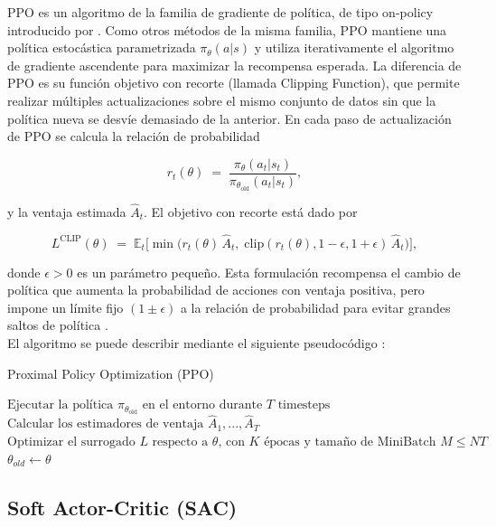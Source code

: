 PPO es un algoritmo de la familia de gradiente de política, de tipo on-policy introducido por \textcite{schulman2017ppo}. Como otros métodos de la misma familia, PPO mantiene una política estocástica parametrizada $\pi_\theta(a|s)$ y utiliza iterativamente el algoritmo de gradiente ascendente para maximizar la recompensa esperada. La diferencia de PPO es su función objetivo con recorte (llamada Clipping Function), que permite realizar múltiples actualizaciones sobre el mismo conjunto de datos sin que la política nueva se desvíe demasiado de la anterior. En cada paso de actualización de PPO se calcula la relación de probabilidad

$$
r_t(\theta) \;=\; \frac{\pi_\theta(a_t|s_t)}{\pi_{\theta_{\text{old}}}(a_t|s_t)},
$$

y la ventaja estimada $\hat A_t$. El objetivo con recorte está dado por

$$
L^{\mathrm{CLIP}}(\theta) \;=\; \mathbb{E}_t\Big[\min\big(r_t(\theta)\,\hat A_t,\;\mathrm{clip}(r_t(\theta),1-\epsilon,1+\epsilon)\,\hat A_t\big)\Big],
$$

donde $\epsilon>0$ es un parámetro pequeño. Esta formulación recompensa el cambio de política que aumenta la probabilidad de acciones con ventaja positiva, pero impone un límite fijo $(1\pm \epsilon)$ a la relación de probabilidad para evitar grandes saltos de política \parencite{schulman2017ppo}.\\

El algoritmo se puede describir mediante el siguiente pseudocódigo \parencite{schulman2017ppo}:

\begin{algorithm}
	\caption{Proximal Policy Optimization (PPO)}\label{alg:ppo}
	\begin{algorithmic}[1]
		\State $\text{Ejecutar la política } \pi_{\theta_\text{old}} \text{ en el entorno durante } T \text{ timesteps}$
		\State $\text{Calcular los estimadores de ventaja } \hat{A}_1, ..., \hat{A}_{T}$
		\EndFor
		\State $\text{Optimizar el surrogado } L \text{ respecto a } \theta \text{, con } K \text{ épocas y tamaño de MiniBatch } M \leq NT$
		\State $\theta_{old} \leftarrow \theta$
		\EndFor
	\end{algorithmic}
\end{algorithm}


\subsection{Soft Actor-Critic (SAC)}

